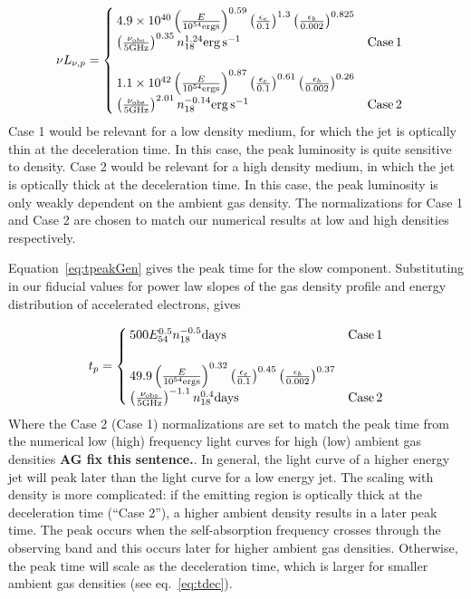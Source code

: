 \documentclass[usenatbib,fleqn]{mnras}
\begin{document}
\begin{align}
\nu L_{\nu, p}&=
\begin{cases}
  4.9\times 10^{40} \left(\frac{E}{10^{54} {\rm ergs}}\right)^{0.59}
  \left(\frac{\epsilon_e}{0.1}\right)^{1.3}
  \left(\frac{\epsilon_b}{0.002}\right)^{0.825}\\
  \left(\frac{\nu_{\rm obs}}{5 {\rm GHz}}\right)^{0.35} n_{18}^{1.24} 
  {\rm erg \, s^{-1}} & {\rm Case \,1}\\\\
 1.1 \times 10^{42}  \left(\frac{E}{10^{54} {\rm ergs}}\right)^{0.87}
  \left(\frac{\epsilon_e}{0.1}\right)^{0.61}
  \left(\frac{\epsilon_b}{0.002}\right)^{0.26}\\
  \left(\frac{\nu_{\rm obs}}{5 {\rm GHz}}\right)^{2.01} n_{18}^{-0.14}
  {\rm erg\, s^{-1}} & {\rm Case \,2}
\end{cases}
\label{eq:peakLum}
\end{align}
%
Case 1 would be relevant for a low density medium, for which the jet is
optically thin at the deceleration time. In this case, the peak
luminosity is quite sensitive to density. Case 2 would be relevant for
a high density medium, in which the jet is optically thick at the
deceleration time. In this case, the peak luminosity is only weakly
dependent on the ambient gas density. The normalizations for Case 1
and Case 2 are chosen to match our numerical results at low and high
densities respectively.

Equation~\eqref{eq:tpeakGen} gives the peak time for the slow
component. Substituting in our fiducial values for power law slopes of
the gas density profile and energy distribution of accelerated
electrons, gives


\begin{align}
t_p=
\begin{cases}
  500 E_{54}^{0.5} n_{18}^{-0.5} {\rm days} & {\rm Case \, 1}\\\\
  49.9 \left(\frac{E}{10^{54} {\rm ergs}}\right)^{0.32}
  \left(\frac{\epsilon_e}{0.1}\right)^{0.45}
  \left(\frac{\epsilon_b}{0.002}\right)^{0.37}\\
  \left(\frac{\nu_{\rm obs}}{5 {\rm GHz}}\right)^{-1.1} n_{18}^{0.4}
  {\rm days}& {\rm Case \, 2}
\end{cases}
\label{eq:peakTime}
\end{align}
%
Where the Case 2 (Case 1) normalizations are set to match the peak
time from the numerical low (high) frequency light curves for high
(low) ambient gas densities {\bf AG fix this sentence.}. In general,
the light curve of a higher energy jet will peak later than the light
curve for a low energy jet. The scaling with density is more
complicated: if the emitting region is optically thick at the
deceleration time (``Case 2''), a higher ambient density results in a
later peak time. The peak occurs when the self-absorption frequency
crosses through the observing band and this occurs later for higher
ambient gas densities. Otherwise, the peak time will scale as the
deceleration time, which is larger for smaller ambient gas densities
(see eq.~\ref{eq:tdec}).
\end{document}
